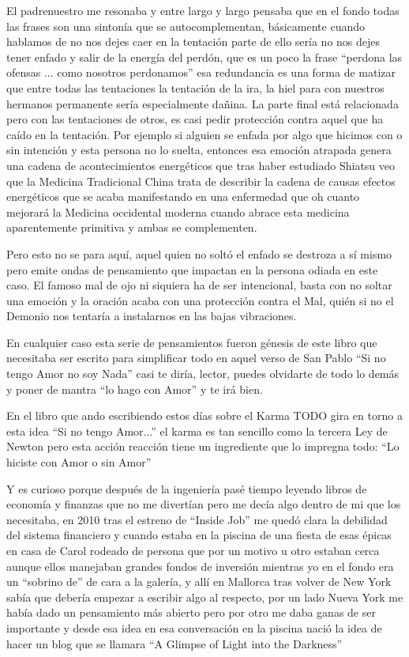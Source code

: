 El padrenuestro me resonaba y entre largo y largo pensaba que en el fondo todas las frases son una sintonía que se autocomplementan, básicamente cuando hablamos de no nos dejes caer en la tentación parte de ello sería no nos dejes tener enfado y salir de la energía del perdón, que es un poco la frase ``perdona las ofensas ... como nosotros perdonamos'' esa redundancia es una forma de matizar que entre todas las tentaciones la tentación de la ira, la hiel para con nuestros hermanos permanente sería especialmente dañina. La parte final está relacionada pero con las tentaciones de otros, es casi pedir protección contra aquel que ha caído en la tentación. Por ejemplo si alguien se enfada por algo que hicimos con o sin intención y esta persona no lo suelta, entonces esa emoción atrapada genera una cadena de acontecimientos energéticos que tras haber estudiado Shiatsu veo que la Medicina Tradicional China trata de describir la cadena de causas efectos energéticos que se acaba manifestando en una enfermedad que oh cuanto mejorará la Medicina occidental moderna cuando abrace esta medicina aparentemente primitiva y ambas se complementen.

Pero esto no se para aquí, aquel quien no soltó el enfado se destroza a sí mismo pero emite ondas de pensamiento que impactan en la persona odiada en este caso. El famoso mal de ojo ni siquiera ha de ser intencional, basta con no soltar una emoción y la oración acaba con una protección contra el Mal, quién si no el Demonio nos tentaría a instalarnos en las bajas vibraciones. 

En cualquier caso esta serie de pensamientos fueron génesis de este libro que necesitaba ser escrito para simplificar todo en aquel verso de San Pablo ``Si no tengo Amor no soy Nada'' casi te diría, lector, puedes olvidarte de todo lo demás y poner de mantra ``lo hago con Amor'' y te irá bien.

En el libro que ando escribiendo estos días sobre el Karma TODO gira en torno a esta idea ``Si no tengo Amor...'' el karma es tan sencillo como la tercera Ley de Newton pero esta acción reacción tiene un ingrediente que lo impregna todo: ``Lo hiciste con Amor o sin Amor'' 

Y es curioso porque después de la ingeniería pasé tiempo leyendo libros de economía y finanzas que no me divertían pero me decía algo dentro de mi que los necesitaba, en 2010 tras el estreno de ``Inside Job'' me quedó clara la debilidad del sistema financiero y cuando estaba en la piscina de una fiesta de esas épicas en casa de Carol rodeado de persona que por un motivo u otro estaban cerca aunque ellos manejaban grandes fondos de inversión mientras yo en el fondo era un ``sobrino de'' de cara a la galería, y allí en Mallorca tras volver de New York sabía que debería empezar a escribir algo al respecto, por un lado Nueva York me había dado un pensamiento más abierto pero por otro me daba ganas de ser importante y desde esa idea en esa conversación en la piscina nació la idea de hacer un blog que se llamara ``A Glimpse of Light into the Darkness''



